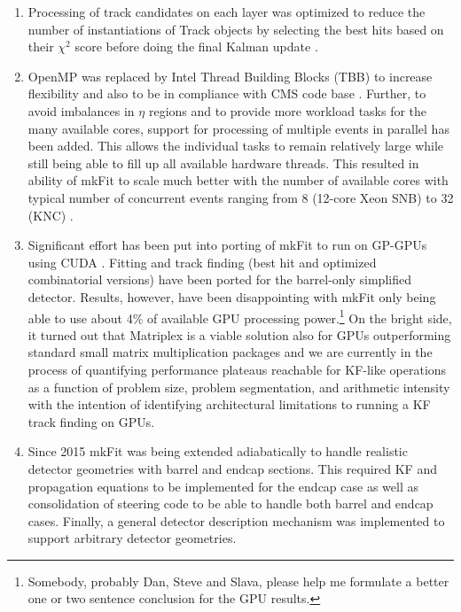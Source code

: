\documentclass{webofc}
\def\mkfit{mkFit\xspace}
\begin{document}
\begin{enumerate}\topsep-2pt\itemsep-2pt

\item Processing of track candidates on each layer was optimized to
  reduce the number of instantiations of Track objects by selecting the best
  hits based on their $\chi^2$ score before doing the final Kalman update
  \cite{pkf-clone-engine}.

\item OpenMP was replaced by Intel Thread Building Blocks (TBB) to increase
  flexibility and also to be in compliance with CMS code base
  \cite{pkf-tbb}. Further, to avoid imbalances in $\eta$ regions and to provide
  more workload tasks for the many available cores, support for processing of
  multiple events in parallel has been added. This allows the individual tasks
  to remain relatively large while still being able to fill up all available
  hardware threads. This resulted in ability of \mkfit to scale much better with
  the number of available cores with typical number of concurrent events ranging
  from 8 (12-core Xeon SNB) to 32 (KNC) \cite{pkf-acat-17}.

\item Significant effort has been put into porting of \mkfit to run on GP-GPUs
  using CUDA \cite{pkf-gpu}. Fitting and track finding (best hit and optimized
  combinatorial versions) have been ported for the barrel-only simplified
  detector. Results, however, have been disappointing with \mkfit only being
  able to use about 4\% of available GPU processing power.\footnote{Somebody,
    probably Dan, Steve and Slava, please help me formulate a better one or two
    sentence conclusion for the GPU results.} On the bright side, it turned
  out that Matriplex is a viable solution also for GPUs outperforming standard
  small matrix multiplication packages and we are currently in the process of
  quantifying performance plateaus reachable for KF-like operations as a
  function of problem size, problem segmentation, and arithmetic intensity
  with the intention of identifying architectural limitations to running a KF
  track finding on GPUs.

\item Since 2015 \mkfit was being extended adiabatically to handle realistic
  detector geometries with barrel and endcap sections. This required KF and
  propagation equations to be implemented for the endcap case as well as
  consolidation of steering code to be able to handle both barrel and endcap
  cases. Finally, a general detector description mechanism was implemented to
  support arbitrary detector geometries.


\end{enumerate}
\end{document}
